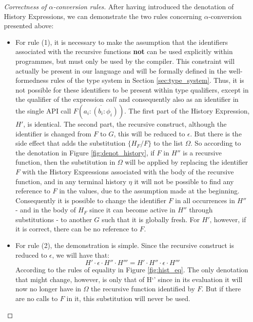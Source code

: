 \begin{proof}[Correctness of $\alpha$-conversion rules] After having introduced the denotation of History Expressions, we can demonstrate the two rules concerning $\alpha$-conversion presented above:
    \begin{itemize}
        \item For rule (1), it is necessary to make the assumption that the identifiers associated with the recursive functions \textbf{not} can be used explicitly within programmes, but must only be used by the compiler. This constraint will actually be present in our language and will be formally defined in the well-formedness rules of the type system in Section \ref{sec:type_system}. Thus, it is not possible for these identifiers to be present within type qualifiers, except in the qualifier of the expression $call$ and consequently also as an identifier in the single API call $F(\overline{a_i{:}(b_i{:}\phi_i)})$.
        The first part of the History Expression, $H'$, is identical. The second part, the recursive construct, although the identifier is changed from $F$ to $G$, this will be reduced to $\epsilon$. But there is the side effect that adds the substitution $\{H_F/F\}$ to the list $\Omega$. So according to the denotation in Figure \ref{fig:denot_history}, if $F$ in $H''$ is a recursive function, then the substitution in $\Omega$ will be applied by replacing the identifier $F$ with the History Expressions associated with the body of the recursive function, and in any terminal history $\eta$ it will not be possible to find any reference to $F$ in the values, due to the assumption made at the beginning. Consequently it is possible to change the identifier $F$ in all occurrences in $H''$ - and in the body of $H_F$ since it can become active in $H''$ through substitutions - to another $G$ such that it is globally fresh. For $H'$, however, if it is correct, there can be no reference to $F$.
        \item For rule (2), the demonstration is simple. Since the recursive construct is reduced to $\epsilon$, we will have that:
        \begin{equation}
            H' \cdot \epsilon \cdot H'' \cdot H''' = H' \cdot H'' \cdot \epsilon \cdot H'''
        \end{equation}
        According to the rules of equality in Figure \ref{fig:hist_eq}. The only denotation that might change, however, is only that of H‘’ since in its evaluation it will now no longer have in $\Omega$ the recursive function identified by $F$. But if there are no calls to $F$ in it, this substitution will never be used.
    \end{itemize}
\end{proof}

